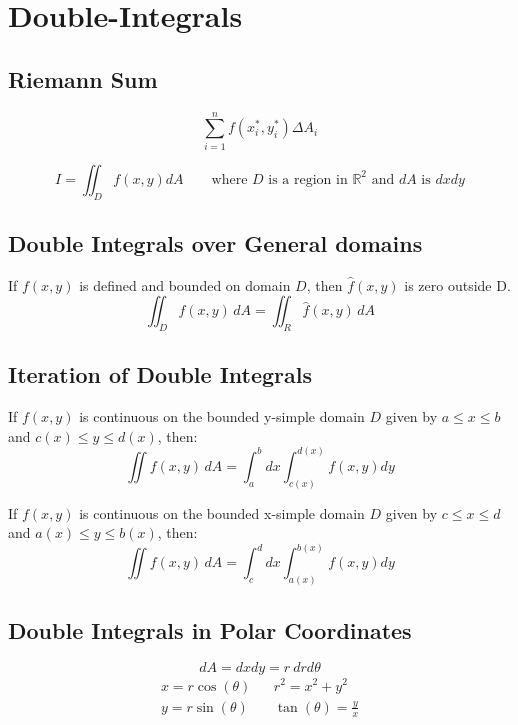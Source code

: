 \section{Double-Integrals}
\subsection{Riemann Sum}
$$\sum_{i=1}^n f(x_i^*, y_i^*) \Delta A_i$$

\[
  I=\iint_D f(x,y) dA\quad \quad \text{where } D \text{ is a region in } \mathbb{R}^2 \text{ and } dA \text{ is }dxdy
\]

\subsection{Double Integrals over General domains}
If $f(x,y)$ is defined and bounded on domain $D$, then $\hat{f}(x,y)$ is zero outside D.
$$\iint_{D}f(x,y)\,d A=\iint_{R}{\hat{f}}(x,y)\,d A$$

\subsection{Iteration of Double Integrals}
If $f(x,y)$ is continuous on the bounded y-simple domain $D$ given by $a\leq x\leq b$ and $c(x)\leq y\leq d(x)$, then:
$$\iint f(x,y)\,d A=\int_a^b dx \int_{c(x)}^{d(x)}f(x,y)dy$$

If $f(x,y)$ is continuous on the bounded x-simple domain $D$ given by $c\leq x\leq d$ and $a(x)\leq y\leq b(x)$, then:
$$\iint f(x,y)\,d A=\int_c^d dx \int_{a(x)}^{b(x)}f(x,y)dy$$
\subsection{Double Integrals in Polar Coordinates}
$$dA=dxdy = r\ dr d\theta$$
$$\begin{array}{lll}
  x=r\cos(\theta)&&r^2=x^2+y^2\\
  y=r\sin(\theta)&&\tan(\theta)=\frac{y}{x}
\end{array}$$

